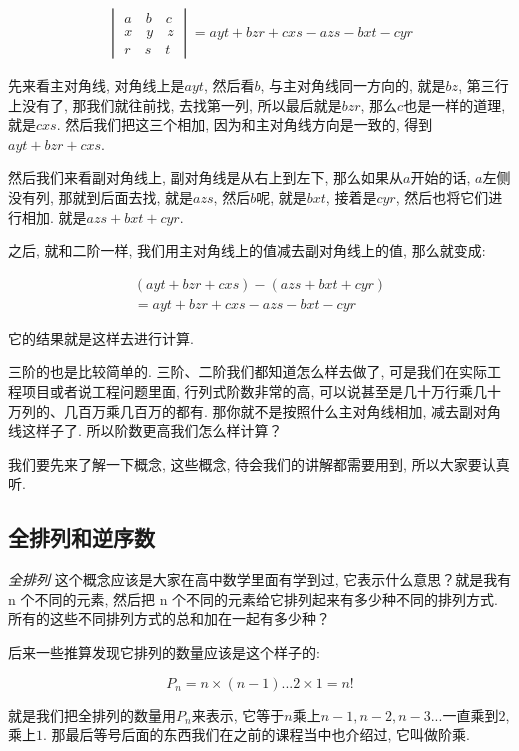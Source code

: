\begin{align*}
  \begin{vmatrix}
  a \quad b \quad c \\
  x \quad y \quad z \\
  r \quad s \quad t
  \end{vmatrix}
  =
  ayt + bzr + cxs - azs - bxt -cyr
\end{align*}

先来看主对角线, 对角线上是$ayt$, 然后看$b$,  与主对角线同一方向的, 就是$bz$, 第三行上没有了, 那我们就往前找, 去找第一列, 所以最后就是$bzr$, 那么$c$也是一样的道理, 就是$cxs$. 然后我们把这三个相加, 因为和主对角线方向是一致的, 得到$ayt + bzr + cxs$. 

然后我们来看副对角线上, 副对角线是从右上到左下, 那么如果从$a$开始的话, $a$左侧没有列, 那就到后面去找, 就是$azs$, 然后$b$呢, 就是$bxt$, 接着是$cyr$, 然后也将它们进行相加. 就是$azs+bxt+cyr$. 

之后, 就和二阶一样, 我们用主对角线上的值减去副对角线上的值, 那么就变成: 

\begin{align*}
  (ayt + bzr + cxs) - (azs+bxt+cyr) \\
  = ayt + bzr + cxs - azs - bxt -cyr
\end{align*}

它的结果就是这样去进行计算. 

三阶的也是比较简单的. 三阶、二阶我们都知道怎么样去做了, 可是我们在实际工程项目或者说工程问题里面, 行列式阶数非常的高, 可以说甚至是几十万行乘几十万列的、几百万乘几百万的都有. 那你就不是按照什么主对角线相加, 减去副对角线这样子了. 所以阶数更高我们怎么样计算？

我们要先来了解一下概念, 这些概念, 待会我们的讲解都需要用到, 所以大家要认真听. 

\subsection{全排列和逆序数}

\textit{全排列} 这个概念应该是大家在高中数学里面有学到过, 它表示什么意思？就是我有 n 个不同的元素, 然后把 n 个不同的元素给它排列起来有多少种不同的排列方式. 所有的这些不同排列方式的总和加在一起有多少种？

后来一些推算发现它排列的数量应该是这个样子的: 

\[
  P_n = n \times (n-1) ... 2 \times 1 = n!
\]

就是我们把全排列的数量用$P_n$来表示, 它等于$n$乘上$n-1, n-2, n-3...$一直乘到$2$,乘上$1$. 那最后等号后面的东西我们在之前的课程当中也介绍过, 它叫做阶乘. 

